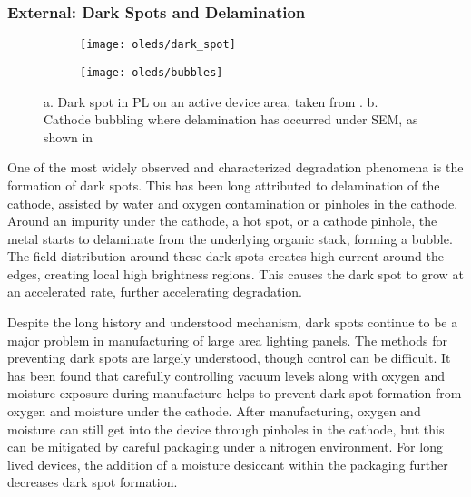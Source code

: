 \documentclass[../thesis.tex]{subfiles}
\begin{document}
\subsubsection{External: Dark Spots and Delamination}

\begin{figure}[ht]
    \centering
    \begin{subfigure}{.4\textwidth}
    \texttt{[image: oleds/dark\_spot]}
    \caption{}
    \label{fig:oleds_dark_spot}\par\vfill
    \end{subfigure}
    \begin{subfigure}{.4\textwidth}
    \texttt{[image: oleds/bubbles]}
    \caption{}
    \label{fig:oleds_bubbles}
    \end{subfigure}
\caption{a. Dark spot in PL on an active device area, taken from \textcite{Kolosov2001}. b. Cathode bubbling where delamination has occurred under SEM, as shown in \textcite{Wang2002a}}
\end{figure}

One of the most widely observed and characterized degradation phenomena is the formation of dark spots.\supercite{Burrows1994,Aziz2004,Popovic2002,Liew2006}
This has been long attributed to delamination of the cathode, assisted by water and oxygen contamination or pinholes in the cathode.\supercite{Kolosov2001,Melpignano2005,Liao2007,Liew2006,Wang2002a}
Around an impurity under the cathode, a hot spot, or a cathode pinhole, the metal starts to delaminate from the underlying organic stack, forming a bubble.\supercite{Liao2007,Shin2006,Scott1996}
The field distribution around these dark spots creates high current around the edges, creating local high brightness regions.
This causes the dark spot to grow at an accelerated rate, further accelerating degradation.\supercite{Shin2006,Cumpston1997,Scott1996}

Despite the long history and understood mechanism, dark spots continue to be a major problem in manufacturing of large area lighting panels.\supercite{Giebink2017a}
The methods for preventing dark spots are largely understood, though control can be difficult.
It has been found that carefully controlling vacuum levels along with oxygen and moisture exposure during manufacture helps to prevent dark spot formation from oxygen and moisture under the cathode.
After manufacturing, oxygen and moisture can still get into the device through pinholes in the cathode, but this can be mitigated by careful packaging under a nitrogen environment.
For long lived devices, the addition of a moisture desiccant within the packaging further decreases dark spot formation.
\end{document}
